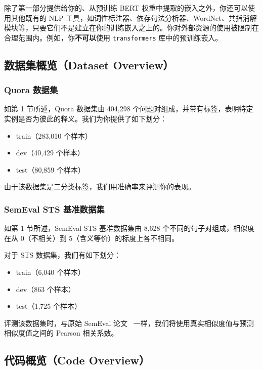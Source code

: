 \documentclass[11pt]{article}
\begin{document}
除了第一部分提供给你的、从预训练 BERT 权重中提取的嵌入之外，你还可以使用其他既有的 NLP 工具，如词性标注器、依存句法分析器、WordNet、共指消解模块等，只要它们不是建立在你的训练嵌入之上的。你对外部资源的使用被限制在合理范围内。例如，你\textbf{不可以}使用 \texttt{transformers} 库中的预训练嵌入。

\subsection{数据集概览（Dataset Overview）}

\subsubsection{Quora 数据集}

如第 1 节所述，Quora 数据集由 404{,}298 个问题对组成，并带有标签，表明特定实例是否为彼此的释义。我们为你提供了如下划分：

\begin{itemize}[leftmargin=1.5em]
  \item train（283{,}010 个样本）
  \item dev（40{,}429 个样本）
  \item test（80{,}859 个样本）
\end{itemize}

由于该数据集是二分类标签，我们用准确率来评测你的表现。

\subsubsection{SemEval STS 基准数据集}

如第 1 节所述，SemEval STS 基准数据集由 8{,}628 个不同的句子对组成，相似度在从 0（不相关）到 5（含义等价）的标度上各不相同。

对于 STS 数据集，我们有如下划分：

\begin{itemize}[leftmargin=1.5em]
  \item train（6{,}040 个样本）
  \item dev（863 个样本）
  \item test（1{,}725 个样本）
\end{itemize}

评测该数据集时，与原始 SemEval 论文~\cite{agirre2013sem} 一样，我们将使用真实相似度值与预测相似度值之间的 Pearson 相关系数。

\subsection{代码概览（Code Overview）}
\end{document}
